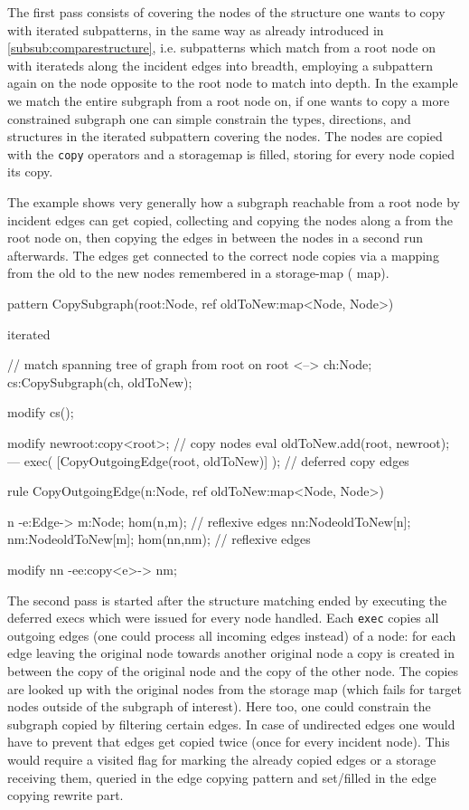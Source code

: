 The first pass consists of covering the nodes of the structure one wants to copy with iterated subpatterns,
in the same way as already introduced in \ref{subsub:comparestructure},
i.e. subpatterns which match from a root node on with iterateds along the incident edges into breadth,
employing a subpattern again on the node opposite to the root node to match into depth.
In the example we match the entire subgraph from a root node on, if one wants to copy a more constrained subgraph one can simple constrain the types, directions, and structures in the iterated subpattern covering the nodes.
The nodes are copied with the \texttt{copy} operators and a storagemap is filled, storing for every node copied its copy.

  \begin{example}
The example shows very generally how a subgraph reachable from a root node by incident edges can get copied, collecting and copying the nodes along a  from the root node on, then copying the edges in between the nodes in a second run afterwards. The edges get connected to the correct node copies via a mapping from the old to the new nodes remembered in a storage-map ( map).
    \begin{grgen}
pattern CopySubgraph(root:Node, ref oldToNew:map<Node, Node>)
{
  iterated { // match spanning tree of graph from root on
    root <--> ch:Node;
    cs:CopySubgraph(ch, oldToNew);

    modify {
      cs();
    }
  }

  modify {
    newroot:copy<root>; // copy nodes
    eval { oldToNew.add(root, newroot); }
  ---
    exec( [CopyOutgoingEdge(root, oldToNew)] ); // deferred copy edges
  }
}

rule CopyOutgoingEdge(n:Node, ref oldToNew:map<Node, Node>)
{
  n -e:Edge-> m:Node;
  hom(n,m); // reflexive edges
  nn:Node{oldToNew[n]}; nm:Node{oldToNew[m]};
  hom(nn,nm); // reflexive edges

  modify {
    nn -ee:copy<e>-> nm;
  }
}
    \end{grgen}
  \end{example}

The second pass is started after the structure matching ended by executing the deferred execs which were issued for every node handled.
Each \texttt{exec} copies all outgoing edges (one could process all incoming edges instead) of a node:
for each edge leaving the original node towards another original node a copy is created in between the copy of the original node and the copy of the other node.
The copies are looked up with the original nodes from the storage map (which fails for target nodes outside of the subgraph of interest).
Here too, one could constrain the subgraph copied by filtering certain edges.
In case of undirected edges one would have to prevent that edges get copied twice (once for every incident node). This would require a visited flag for marking the already copied edges or a storage receiving them, queried in the edge copying pattern and set/filled in the edge copying rewrite part.

